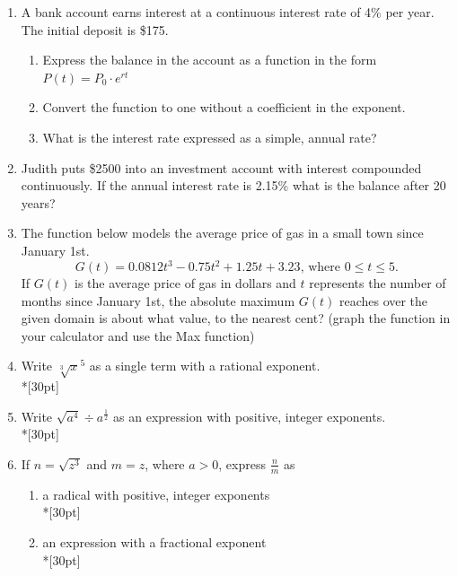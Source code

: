 \documentclass[12pt, oneside]{article}
\begin{document}

\vspace{1cm}

\begin{enumerate}


\item A bank account earns interest at a continuous interest rate of 4\% per year. The initial deposit is \$175.
\begin{enumerate}
    \item Express the balance in the account as a function in the form $P(t)=P_0 \cdot e^{rt}$\\[30pt]
    \item Convert the function to one without a coefficient in the exponent. \\[30pt]
    \item What is the interest rate expressed as a simple, annual rate?\\[30pt]
\end{enumerate}

\item Judith puts \$2500 into an investment account with interest compounded continuously. If the annual interest rate is 2.15\% what is the balance after 20 years?\\[80pt]

\item The function below models the average price of gas in a small town since January 1st.
\[G(t)=0.0812t^3 - 0.75t^2 +1.25t+3.23 \text{, where } 0 \leq t \leq 5.\]
If $G(t)$ is the average price of gas in dollars and $t$ represents the number of months since January 1st, the absolute maximum $G(t)$ reaches over the given domain is about what value, to the nearest cent? (graph the function in your calculator and use the Max function)%

\newpage


\item Write $\sqrt[3]x^5$ as a single term with a rational exponent.\\*[30pt]

\item Write $\sqrt{a^4} \div a^{\frac{1}{2}}$ as an expression with positive, integer exponents.\\*[30pt]

\item If $n=\sqrt{z^3}$ and $m=z$, where $a > 0$, express $\frac{n}{m}$ as 
\begin{enumerate}
    \item a radical with positive, integer exponents\\*[30pt]
    \item an expression with a fractional exponent\\*[30pt]
\end{enumerate}


\end{enumerate}
\end{document}
